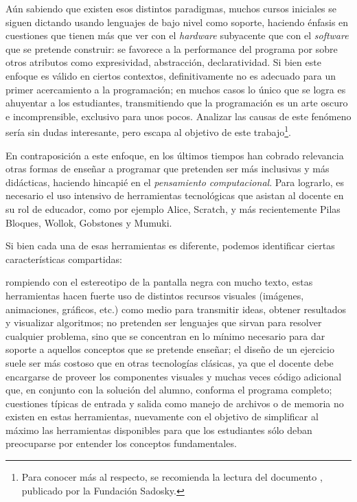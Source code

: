 Aún sabiendo que existen esos distintos paradigmas, muchos cursos iniciales se siguen dictando usando lenguajes de bajo nivel como soporte, haciendo énfasis en cuestiones que tienen más que ver con el \textit{hardware} subyacente que con el \textit{software} que se pretende construir: se favorece a la performance del programa por sobre otros atributos como expresividad, abstracción, declaratividad. Si bien este enfoque es válido en ciertos contextos, definitivamente no es adecuado para un primer acercamiento a la programación; en muchos casos lo único que se logra es ahuyentar a los estudiantes, transmitiendo que la programación es un arte oscuro e incomprensible, exclusivo para unos pocos. Analizar las causas de este fenómeno sería sin dudas interesante, pero escapa al objetivo de este trabajo\footnote{Para conocer más al respecto, se recomienda la lectura del documento , publicado por la Fundación Sadosky.}.

En contraposición a este enfoque, en los últimos tiempos han cobrado relevancia otras formas de enseñar a programar que pretenden ser más inclusivas y más didácticas, haciendo hincapié en el \textit{pensamiento computacional}\cite{Wing}. Para lograrlo, es necesario el uso intensivo de herramientas tecnológicas que asistan al docente en su rol de educador, como por ejemplo Alice, Scratch, y más recientemente Pilas Bloques, Wollok, Gobstones y Mumuki.

Si bien cada una de esas herramientas es diferente, podemos identificar ciertas características compartidas:
\begin{itemize}
   rompiendo con el estereotipo de la pantalla negra con mucho texto, estas herramientas hacen fuerte uso de distintos recursos visuales (imágenes, animaciones, gráficos, etc.) como medio para transmitir ideas, obtener resultados y visualizar algoritmos;
   no pretenden ser lenguajes que sirvan para resolver cualquier problema, sino que se concentran en lo mínimo necesario para dar soporte a aquellos conceptos que se pretende enseñar;
   el diseño de un ejercicio suele ser más costoso que en otras tecnologías clásicas, ya que el docente debe encargarse de proveer los componentes visuales y muchas veces código adicional que, en conjunto con la solución del alumno, conforma el programa completo;
   cuestiones típicas de entrada y salida como manejo de archivos o de memoria no existen en estas herramientas, nuevamente con el objetivo de simplificar al máximo las herramientas disponibles para que los estudiantes sólo deban preocuparse por entender los conceptos fundamentales.
\end{itemize}

